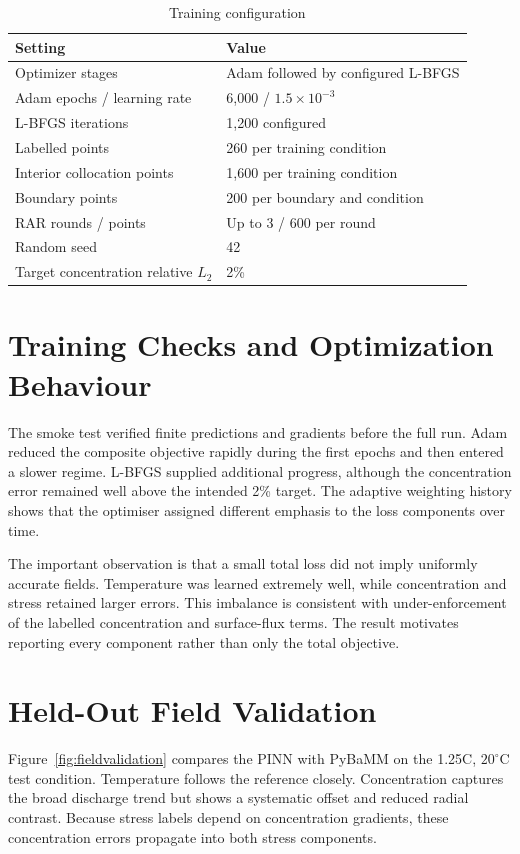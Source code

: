 \documentclass[14pt,a4paper,oneside]{extreport}
\begin{document}
\begin{table}[htbp]
\centering
\caption{Training configuration}
\small
\begin{tabularx}{\textwidth}{p{}X}
\toprule
Setting & Value\\
\midrule
Optimizer stages & Adam followed by configured L-BFGS\\
Adam epochs / learning rate & 6,000 / $1.5\times10^{-3}$\\
L-BFGS iterations & 1,200 configured\\
Labelled points & 260 per training condition\\
Interior collocation points & 1,600 per training condition\\
Boundary points & 200 per boundary and condition\\
RAR rounds / points & Up to 3 / 600 per round\\
Random seed & 42\\
Target concentration relative $L_2$ & 2\%\\
\bottomrule
\end{tabularx}
\end{table}

\section{Training Checks and Optimization Behaviour}
The smoke test verified finite predictions and gradients before the full run. Adam reduced the composite objective rapidly during the first epochs and then entered a slower regime. L-BFGS supplied additional progress, although the concentration error remained well above the intended 2\% target. The adaptive weighting history shows that the optimiser assigned different emphasis to the loss components over time.

The important observation is that a small total loss did not imply uniformly accurate fields. Temperature was learned extremely well, while concentration and stress retained larger errors. This imbalance is consistent with under-enforcement of the labelled concentration and surface-flux terms. The result motivates reporting every component rather than only the total objective.

\section{Held-Out Field Validation}
Figure~\ref{fig:fieldvalidation} compares the PINN with PyBaMM on the 1.25C, $20^{\circ}$C test condition. Temperature follows the reference closely. Concentration captures the broad discharge trend but shows a systematic offset and reduced radial contrast. Because stress labels depend on concentration gradients, these concentration errors propagate into both stress components.
\end{document}
